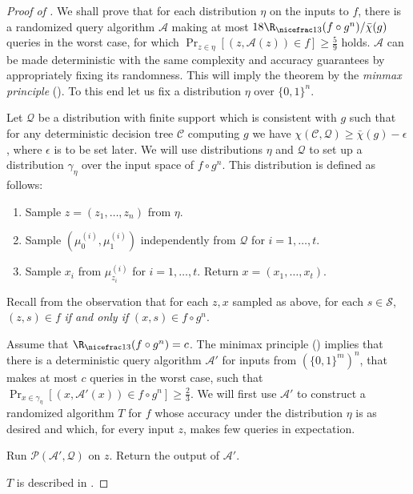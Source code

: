 \documentclass{toc}
\newcommand{\dr}{\nicefrac}
\newcommand{\cA}{\mathcal{A}}
\newcommand{\clC}{\mathcal{C}}
\newcommand{\clQ}{\mathcal{Q}}
\newcommand{\clP}{\mathcal{P}}
\begin{document}
\begin{proof}[Proof of {}]
We shall prove that for each distribution $\eta$ on the inputs to $f$, there is a randomized query algorithm $\cA$ making at most $18\R_{\dr13}(f \circ g^n) /\bar \chi(g)$ queries in the worst case, for which $\Pr_{z \in \eta}[(z,\cA(z)) \in f] \geq \frac{5}{9}$ holds. $\cA$ can be made deterministic with the same complexity and accuracy guarantees by appropriately fixing its randomness. This will imply the theorem by the \emph{minmax principle} (). To this end let us fix a distribution $\eta$ over $\{0,1\}^n$.

Let $\clQ$ be a distribution with finite support which is consistent with $g$ such that for any deterministic decision tree $\clC$ computing $g$ we have $\chi(\clC,\clQ) \ge \bar \chi(g)-\epsilon$, where $\epsilon$ is to be set later.
We will use distributions $\eta$ and $\clQ$ to set up a distribution $\gamma_\eta$ over the  input space of $f \circ g^n$.  This distribution is defined as follows:
\begin{enumerate}
\item Sample $z =(z_1, \ldots, z_n)$ from $\eta$.
\item Sample $(\mu_0^{(i)}, \mu_1^{(i)})$ independently from $\clQ$ for $i = 1, \ldots, t$.
\item Sample $x_i$ from $\mu_{z_i}^{(i)}$ for $i=1, \ldots, t$. Return $x = (x_1, \ldots, x_t)$.
\end{enumerate}
Recall from  the observation that for each $z, x$ sampled as above, for each $s \in \mathcal{S}$, $(z,s) \in f$ \emph{if and only if} $(x,s) \in f \circ g^n$.

Assume that $\R_{\dr13}(f \circ g^n)=c$. The minimax principle () implies that there is a deterministic query algorithm $\cA'$ for inputs from $\left(\{0,1\}^m\right)^n$, that makes at most $c$ queries in the worst case, such that $\Pr_{x \in \gamma_\eta}[(x,\cA'(x)) \in f \circ g^n] \geq \frac{2}{3}$. We will first use $\cA'$ to construct a randomized algorithm $T$ for $f$ whose accuracy under the distribution $\eta$ is as desired and which, for every input $z$, 
makes few queries in expectation.
\begin{algorithm}[!h]
\DontPrintSemicolon
\caption{ $T$}
\label{Tee}
Run $\clP(\cA', \clQ)$ on $z$. \;
Return the output of $\cA'$. 
\end{algorithm}
$T$ is described in .


\end{proof}
\end{document}
